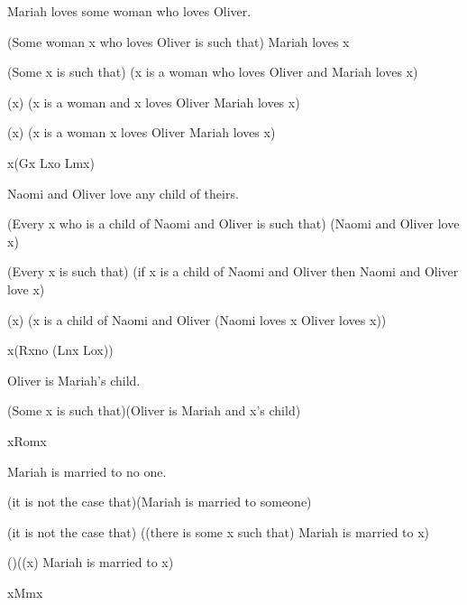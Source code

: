 \begin{argument}
\item[\textbf{(4)}] Mariah loves some woman who loves Oliver.
\item[$\simeq$] (Some woman x who loves Oliver is such that) Mariah loves x
\item[$\simeq$] (Some x is such that)
  (x is a woman who loves Oliver and Mariah loves x)
\item[$\simeq$] (\eexists x)
  (x is a woman and x loves Oliver \eand Mariah loves x)
\item[$\simeq$] (\eexists x)
  (x is a woman \eand x loves Oliver \eand Mariah loves x)
\item[$\simeq$] \eexists x(Gx \eand Lxo \eand Lmx)
\end{argument}

\begin{argument}
\item[\textbf{(5)}] Naomi and Oliver love any child of theirs.
\item[$\simeq$] (Every x who is a child of Naomi and Oliver is such that)
  (Naomi and Oliver love x)
\item[$\simeq$] (Every x is such that)
  (if x is a child of Naomi and Oliver then Naomi and Oliver love x)
\item[$\simeq$] (\eforall x)
  (x is a child of Naomi and Oliver \eif (Naomi loves x \eand Oliver loves x))
\item[$\simeq$] \eforall x(Rxno \eif (Lnx \eand Lox))
\end{argument}

\begin{argument}
\item[\textbf{(6)}] Oliver is Mariah's child.
\item[$\simeq$] (Some x is such that)(Oliver is Mariah and x's child)
\item[$\simeq$] \eexists xRomx
\end{argument}

\begin{argument}
\item[\textbf{(7)}] Mariah is married to no one.
\item[$\simeq$] (it is not the case that)(Mariah is married to someone)
\item[$\simeq$] (it is not the case that)
  ((there is some x such that) Mariah is married to x)
\item[$\simeq$] (\enot)((\eexists x) Mariah is married to x)
\item[$\simeq$] \enot\eexists xMmx
\end{argument}

